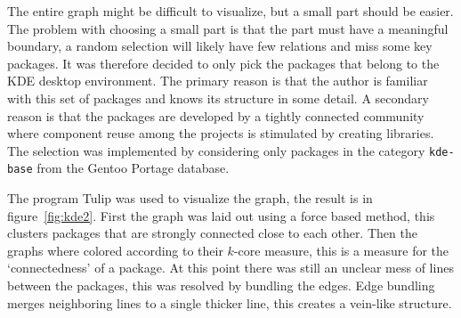 \documentclass[smallextended,final]{svjour3}
\begin{document}
The entire graph might be difficult to visualize, but a small part should be easier. The problem with choosing a small part is that the part must have a meaningful boundary, a random selection will likely have few relations and miss some key packages. It was therefore decided to only pick the packages that belong to the KDE desktop environment. The primary reason is that the author is familiar with this set of packages and knows its structure in some detail. A secondary reason is that the packages are developed by a tightly connected community where component reuse among the projects is stimulated by creating libraries. The selection was implemented by considering only packages in the category \verb|kde-base| from the Gentoo Portage database.

The program Tulip was used to visualize the graph, the result is in figure~\ref{fig:kde2}. First the graph was laid out using a force based method, this clusters packages that are strongly connected close to each other. Then the graphs where colored according to their $k$-core measure, this is a measure for the `connectedness' of a package. At this point there was still an unclear mess of lines between the packages, this was resolved by bundling the edges. Edge bundling merges neighboring lines to a single thicker line, this creates a vein-like structure. 
\end{document}
